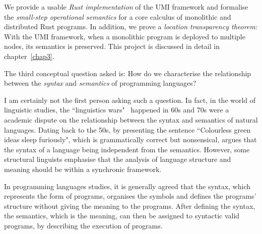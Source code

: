 We provide a usable \emph{Rust implementation} of the UMI framework and formalise the \emph{small-step operational semantics} for a core calculus of monolithic and distributed Rust programs. In addition, we prove a \emph{location transparency theorem}: With the UMI framework, when a monolithic program is deployed to multiple nodes, its semantics is preserved.
This project is discussed in detail in chapter~\ref{chap3}.

\begin{center}
\vspace{-0.7em}
\vspace{-0.3em}
\end{center}

The third conceptual question asked is: 
How do we characterise the relationship between the \emph{syntax} and \emph{semantics} of programming languages?

I am certainly not the first person asking such a question. In fact, in the world of linguistic studies, the ``linguistics wars"~\citep{alma993219653502466} happened in 60s and 70s were a academic dispute on the relationship between the syntax and semantics of natural languages. Dating back to the 50s, by presenting the sentence ``Colourless green ideas sleep furiously", which is grammatically correct but nonsensical, \citet{Chomsky+1957}
argues that the syntax of a language being independent from the semantics. However, some structural linguists emphasise that the analysis of language structure and meaning should be within a synchronic framework.

In programming languages studies, it is generally agreed that the syntax, which represents the form of programs, organises the symbols and defines the programs' structure without giving the meaning to the programs. After defining the syntax, the semantics, which is the meaning, can then be assigned to syntactic valid programs, by describing the execution of programs.

